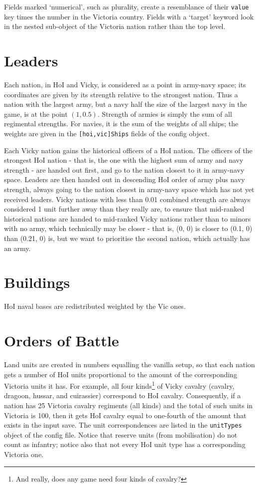 \documentclass[12pt,ebook,oneside]{book}
\begin{document}
Fields marked `numerical', such as plurality, create a resemblance of
their \texttt{value} key times the number in the Victoria
country. Fields with a `target' keyword look in the nested sub-object of
the Victoria nation rather than the top level. 

\section{Leaders}

Each nation, in HoI and Vicky, is considered as a point in army-navy
space; its coordinates are given by its strength relative to the
strongest nation. Thus a nation with the largest army, but a navy half
the size of the largest navy in the game, is at the point $(1, 0.5)$. 
Strength of armies is simply the sum of all regimental strengths. For
navies, it is the sum of the weights of all ships; the weights are
given in the \texttt{[hoi,vic]Ships} fields of the config object. 

Each Vicky nation gains the historical officers of a HoI nation. The
officers of the strongest HoI nation - that is, the one with the
highest sum of army and navy strength - are handed out first, and go
to the nation closest to it in army-navy space. Leaders are then
handed out in descending HoI order of army plus navy strength, always
going to the nation closest in army-navy space which has not yet
received leaders. Vicky nations with less than 0.01 combined strength
are always considered 1 unit further away than they really are, to
ensure that mid-ranked historical nations are handed to mid-ranked
Vicky nations rather than to minors with no army, which technically
may be closer - that is, (0, 0) is closer to (0.1, 0) than (0.21, 0)
is, but we want to prioritise the second nation, which actually has an
army. 

\section{Buildings}

HoI naval bases are redistributed weighted by the Vic ones. 

\section{Orders of Battle}

Land units are created in numbers equalling the vanilla setup, so that
each nation gets a number of HoI units proportional to the amount of the
corresponding Victoria units it has. For example, all four
kinds\footnote{And really, does any game need four kinds of cavalry?}
of Vicky cavalry (cavalry, dragoon, hussar, and cuirassier) correspond
to HoI cavalry. Consequently, if a nation has 25 Victoria cavalry
regiments (all kinds) and the total of such units in Victoria is 100,
then it gets HoI cavalry equal to one-fourth of the amount that exists
in the input save. The unit correspondences are listed in the
\texttt{unitTypes} object of the config file. Notice that reserve
units (from mobilisation) do not count as infantry; notice also that
not every HoI unit type has a corresponding Victoria one. 
\end{document}
